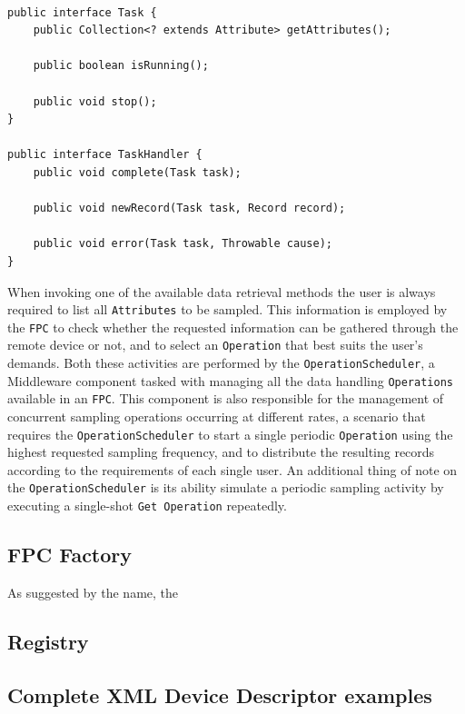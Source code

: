~\\
\lstset{language=java}
\begin{lstlisting}[caption={The \texttt{Task} and \texttt{TaskHandler}
interfaces.},label={lst:task}]
public interface Task {
    public Collection<? extends Attribute> getAttributes();

    public boolean isRunning();

    public void stop();
}

public interface TaskHandler {
    public void complete(Task task);

    public void newRecord(Task task, Record record);

    public void error(Task task, Throwable cause);
}
\end{lstlisting}

When invoking one of the available data retrieval methods the user is always
required to list all \texttt{Attributes} to be sampled. This information is
employed by the \texttt{FPC} to check whether the requested information can be
gathered through the remote device or not, and to select an \texttt{Operation}
that best suits the user's demands. Both these activities are performed by the
\texttt{OperationScheduler}, a Middleware component tasked with managing all
the data handling \texttt{Operations} available in an \texttt{FPC}. This
component is also responsible for the management of concurrent sampling
operations occurring at different rates, a scenario that requires the
\texttt{OperationScheduler} to start a single periodic \texttt{Operation} using
the highest requested sampling frequency, and to distribute the resulting
records according to the requirements of each single user. An additional thing
of note on the \texttt{OperationScheduler} is its ability simulate a periodic
sampling activity by executing a single-shot \texttt{Get Operation} repeatedly.


\subsection{FPC Factory}

As suggested by the name, the 

\subsection{Registry}


\subsection{Complete XML Device Descriptor examples}

